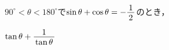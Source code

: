 \documentclass[../../../../uem_mat_mei_q.tex]{subfiles}
\begin{document}
    $90^\circ<\theta<180^\circ$で$\sin\theta+\cos\theta=-\myfraca{1}{2}$のとき，


    \myspacea$\tan\theta+\myfraca{1}{\tan\theta}$
\end{document}
